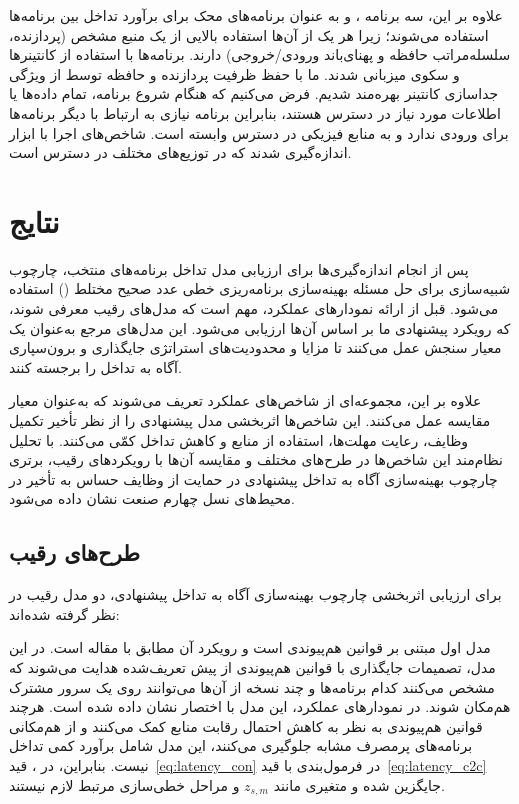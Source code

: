 علاوه بر این، سه برنامه ،  و  به عنوان برنامه‌های محک برای برآورد تداخل بین برنامه‌ها استفاده می‌شوند؛ زیرا هر یک از آن‌ها استفاده بالایی از یک منبع مشخص (پردازنده، سلسله‌مراتب حافظه و پهنای‌باند ورودی/خروجی) دارند. برنامه‌ها با استفاده از کانتینرها و سکوی  میزبانی شدند. ما با حفظ ظرفیت پردازنده و حافظه توسط  از ویژگی جداسازی کانتینر بهره‌مند شدیم. فرض می‌کنیم که هنگام شروع برنامه، تمام داده‌ها یا اطلاعات مورد نیاز در دسترس هستند، بنابراین برنامه نیازی به ارتباط با دیگر برنامه‌ها برای ورودی ندارد و به منابع فیزیکی در دسترس وابسته است. شاخص‌های اجرا با ابزار  \cite{linux2018perf} اندازه‌گیری شدند که در توزیع‌های مختلف  در دسترس است.

\section{نتایج}

پس از انجام اندازه‌گیری‌ها برای ارزیابی مدل تداخل برنامه‌های منتخب، چارچوب شبیه‌سازی برای حل مسئله بهینه‌سازی برنامه‌ریزی خطی عدد صحیح مختلط () استفاده می‌شود. قبل از ارائه نمودارهای عملکرد، مهم است که مدل‌های رقیب معرفی شوند، که رویکرد پیشنهادی ما بر اساس آن‌ها ارزیابی می‌شود. این مدل‌های مرجع به‌عنوان یک معیار سنجش عمل می‌کنند تا مزایا و محدودیت‌های استراتژی جایگذاری و برون‌سپاری آگاه به تداخل را برجسته کنند.

علاوه بر این، مجموعه‌ای از شاخص‌های عملکرد تعریف می‌شوند که به‌عنوان معیار مقایسه عمل می‌کنند. این شاخص‌ها اثربخشی مدل پیشنهادی را از نظر تأخیر تکمیل وظایف، رعایت مهلت‌ها، استفاده از منابع و کاهش تداخل کمّی می‌کنند. با تحلیل نظام‌مند این شاخص‌ها در طرح‌های مختلف و مقایسه آن‌ها با رویکردهای رقیب، برتری چارچوب بهینه‌سازی آگاه به تداخل پیشنهادی در حمایت از وظایف حساس به تأخیر در محیط‌های  نسل چهارم صنعت نشان داده می‌شود.

\subsection{طرح‌های رقیب}

برای ارزیابی اثربخشی چارچوب بهینه‌سازی آگاه به تداخل پیشنهادی، دو مدل رقیب در نظر گرفته شده‌اند:

مدل اول مبتنی بر قوانین هم‌پیوندی است و رویکرد آن مطابق با مقاله \cite{Kaur2020KEIDS} است. در این مدل، تصمیمات جایگذاری با قوانین هم‌پیوندی از پیش تعریف‌شده هدایت می‌شوند که مشخص می‌کنند کدام برنامه‌ها و چند نسخه از آن‌ها می‌توانند روی یک سرور مشترک هم‌مکان شوند. در نمودارهای عملکرد، این مدل با اختصار  نشان داده شده است. هرچند قوانین هم‌پیوندی به نظر به کاهش احتمال رقابت منابع کمک می‌کنند و از هم‌مکانی برنامه‌های پرمصرف مشابه جلوگیری می‌کنند، این مدل شامل برآورد کمی تداخل نیست. بنابراین، در ، قید~\eqref{eq:latency_con} در فرمول‌بندی با قید~\eqref{eq:latency_c2c} جایگزین شده و متغیری مانند $z_{s,m}$ و مراحل خطی‌سازی مرتبط لازم نیستند. 

